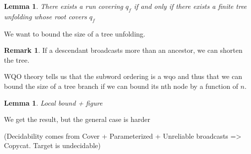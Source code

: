 \documentclass{article}
\newtheorem{lemma}[theorem]{Lemma}
\theoremstyle{definition}
\newtheorem{remark}{Remark}
\begin{document}
	\begin{lemma}
		There exists a run covering $q_f$ if and only if there exists a finite tree unfolding whose root covers $q_f$
	\end{lemma}
	
	We want to bound the size of a tree unfolding.
	
	\begin{remark}
		If a descendant broadcasts more than an ancestor, we can shorten the tree.
	\end{remark}
	
	WQO theory tells us that the subword ordering is a wqo and thus that we can bound the size of a tree branch if we can bound its nth node by a function of $n$.
	
	\begin{lemma}
		Local bound + figure
	\end{lemma}
	
	We get the result, but the general case is harder
	
	(Decidability comes from Cover + Parameterized +  Unreliable broadcasts => Copycat. Target is undecidable)
	
\end{document}
